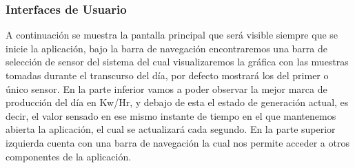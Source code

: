 \subsubsection{Interfaces de Usuario}\label{Interfaces de Usuario}

A continuación se muestra la pantalla principal que será visible siempre que se inicie la aplicación, bajo la barra de navegación encontraremos una barra de selección de sensor del sistema del cual visualizaremos la gráfica con las muestras tomadas durante el transcurso del día, por defecto mostrará los del primer o único sensor. En la parte inferior vamos a poder observar la mejor marca de producción del día en Kw/Hr, y debajo de esta el estado de generación actual, es decir, el valor sensado en ese mismo instante de tiempo en el que mantenemos abierta la aplicación, el cual se actualizará cada segundo. En la parte superior izquierda cuenta con una barra de navegación la cual nos permite acceder a otros componentes de la aplicación.  

